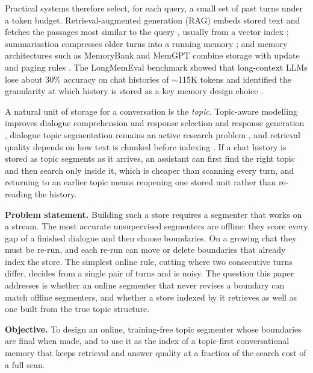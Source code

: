 \documentclass[journal]{IEEEtran}
\begin{document}
Practical systems therefore select, for each query, a small set of past turns
under a token budget. Retrieval-augmented generation (RAG) embeds stored text
and fetches the passages most similar to the query
\cite{wu2026rag,zhao2024dense}, usually from a vector index
\cite{pan2024vectordb}; summarisation compresses older turns into a running
memory \cite{wang2025recursive}; and memory architectures such as MemoryBank
and MemGPT combine storage with update and paging rules
\cite{zhong2024memorybank,packer2023memgpt}. The LongMemEval benchmark showed
that long-context LLMs lose about 30\% accuracy on chat histories of
$\sim$115K tokens and identified the granularity at which history is stored as
a key memory design choice \cite{wu2025longmemeval}.

A natural unit of storage for a conversation is the \emph{topic}. Topic-aware
modelling improves dialogue comprehension and response selection
\cite{ma2024topicaware} and response generation \cite{sun2022hierarchical},
dialogue topic segmentation remains an active research problem
\cite{xu2025umlf}, and retrieval quality depends on how text is chunked before
indexing \cite{lavarec2026chunking}. If a chat history is stored as topic
segments as it arrives, an assistant can first find the right topic and then
search only inside it, which is cheaper than scanning every turn, and returning
to an earlier topic means reopening one stored unit rather than re-reading the
history.

\textbf{Problem statement.} Building such a store requires a segmenter that
works on a stream. The most accurate unsupervised segmenters are offline: they
score every gap of a finished dialogue and then choose boundaries. On a growing
chat they must be re-run, and each re-run can move or delete boundaries that
already index the store. The simplest online rule, cutting where two
consecutive turns differ, decides from a single pair of turns and is noisy. The
question this paper addresses is whether an online segmenter that never revises
a boundary can match offline segmenters, and whether a store indexed by it
retrieves as well as one built from the true topic structure.

\textbf{Objective.} To design an online, training-free topic segmenter whose
boundaries are final when made, and to use it as the index of a topic-first
conversational memory that keeps retrieval and answer quality at a fraction of
the search cost of a full scan.
\end{document}
